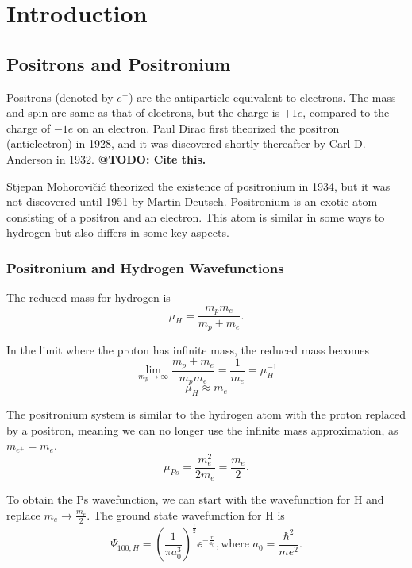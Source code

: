 \documentclass[main.tex]{subfiles}
\begin{document}
\chapter{Introduction}
\label{sec:Introduction}


\section{Positrons and Positronium}
Positrons (denoted by $e^+$) are the antiparticle equivalent to electrons.  The mass and spin are same as that of electrons, but the charge is $+1e$, compared to the charge of $-1e$ on an electron.  Paul Dirac first theorized the positron (antielectron) in 1928, and it was discovered shortly thereafter by Carl D. Anderson in 1932. \textbf{@TODO: Cite this.}

Stjepan Mohorovi\u{c}i\'{c} theorized the existence of positronium in 1934, but it was not discovered until 1951 by Martin Deutsch.  Positronium is an exotic atom consisting of a positron and an electron.  This atom is similar in some ways to hydrogen but also differs in some key aspects.  

\subsection{Positronium and Hydrogen Wavefunctions}
The reduced mass for hydrogen is
\begin{equation}
\mu_H = \frac{m_p m_e}{m_p + m_e}.
\end{equation}

In the limit where the proton has infinite mass, the reduced mass becomes
\begin{equation}
\lim_{m_p \to \infty} \frac{m_p + m_e}{m_p m_e} = \frac{1}{m_e} = \mu_H^{-1}
\end{equation}
\begin{equation}
\mu_H \approx m_e
\end{equation}

The positronium system is similar to the hydrogen atom with the proton replaced by a positron, meaning we can no longer use the infinite mass approximation, as $m_{e^+} = m_e$.
\begin{equation}
\mu_{Ps} = \frac{m_e^2}{2 m_e} = \frac{m_e}{2}.
\end{equation}

To obtain the Ps wavefunction, we can start with the wavefunction for H and replace $m_e \rightarrow \frac{m_e}{2}$.  The ground state wavefunction for H is
\begin{equation}
\Psi_{100,H} = \left(\frac{1}{\pi a_0^3}\right)^{\frac{1}{2}} \!\! \ee^{-\frac{r}{a_0}},
\text{where } a_0 = \frac{\hbar^2}{m e^2}.
\end{equation}
\end{document}
